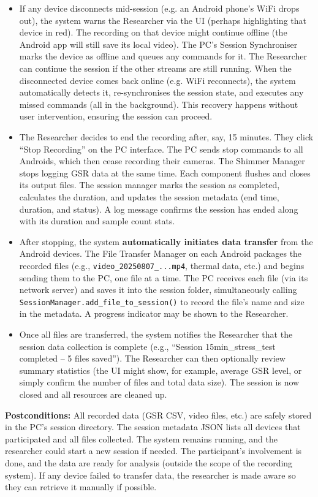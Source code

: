 \begin{itemize}
    \item If any device disconnects mid-session (e.g. an Android phone's WiFi drops out), the system warns the Researcher via the UI (perhaps highlighting that device in red). The recording on that device might continue offline (the Android app will still save its local video). The PC's Session Synchroniser marks the device as offline and queues any commands for it. The Researcher can continue the session if the other streams are still running. When the disconnected device comes back online (e.g. WiFi reconnects), the system automatically detects it, re-synchronises the session state, and executes any missed commands (all in the background). This recovery happens without user intervention, ensuring the session can proceed.
    \item The Researcher decides to end the recording after, say, 15 minutes. They click ``Stop Recording'' on the PC interface. The PC sends stop commands to all Androids, which then cease recording their cameras. The Shimmer Manager stops logging GSR data at the same time. Each component flushes and closes its output files. The session manager marks the session as completed, calculates the duration, and updates the session metadata (end time, duration, and status). A log message confirms the session has ended along with its duration and sample count stats.
    \item After stopping, the system \textbf{automatically initiates data transfer} from the Android devices. The File Transfer Manager on each Android packages the recorded files (e.g., \texttt{video\_20250807\_...mp4}, thermal data, etc.) and begins sending them to the PC, one file at a time. The PC receives each file (via its network server) and saves it into the session folder, simultaneously calling \texttt{SessionManager.add\_file\_to\_session()} to record the file's name and size in the metadata. A progress indicator may be shown to the Researcher.
    \item Once all files are transferred, the system notifies the Researcher that the session data collection is complete (e.g., ``Session 15min\_stress\_test completed -- 5 files saved''). The Researcher can then optionally review summary statistics (the UI might show, for example, average GSR level, or simply confirm the number of files and total data size). The session is now closed and all resources are cleaned up.
\end{itemize}

\textbf{Postconditions:} All recorded data (GSR CSV, video files, etc.) are safely stored in the PC's session directory. The session metadata JSON lists all devices that participated and all files collected. The system remains running, and the researcher could start a new session if needed. The participant's involvement is done, and the data are ready for analysis (outside the scope of the recording system). If any device failed to transfer data, the researcher is made aware so they can retrieve it manually if possible.

